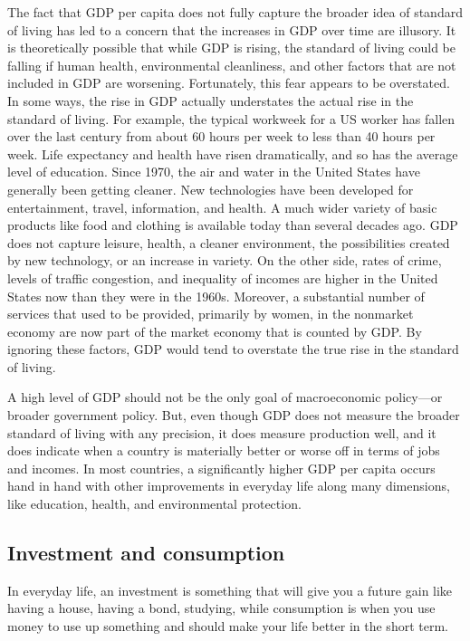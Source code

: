 The fact that GDP per capita does not fully capture the broader idea of standard of living has led to a concern that the increases in GDP over time are illusory. It is theoretically possible that while GDP is rising, the standard of living could be falling if human health, environmental cleanliness, and other factors that are not included in GDP are worsening. Fortunately, this fear appears to be overstated.
In some ways, the rise in GDP actually understates the actual rise in the standard of living. For example, the typical workweek for a US worker has fallen over the last century from about 60 hours per week to less than 40 hours per week. Life expectancy and health have risen dramatically, and so has the average level of education.
Since 1970, the air and water in the United States have generally been getting cleaner. New technologies have been developed for entertainment, travel, information, and health. A much wider variety of basic products like food and clothing is available today than several decades ago. GDP does not capture leisure, health, a cleaner environment, the possibilities created by new technology, or an increase in variety.
On the other side, rates of crime, levels of traffic congestion, and inequality of incomes are higher in the United States now than they were in the 1960s. Moreover, a substantial number of services that used to be provided, primarily by women, in the nonmarket economy are now part of the market economy that is counted by GDP. By ignoring these factors, GDP would tend to overstate the true rise in the standard of living.

A high level of GDP should not be the only goal of macroeconomic policy—or broader government policy. But, even though GDP does not measure the broader standard of living with any precision, it does measure production well, and it does indicate when a country is materially better or worse off in terms of jobs and incomes. In most countries, a significantly higher GDP per capita occurs hand in hand with other improvements in everyday life along many dimensions, like education, health, and environmental protection.

\subsection{Investment and consumption}
In everyday life, an investment is something that will give you a future gain like having a house, having a bond, studying, while consumption is when you use money to use up something and should make your life better in the short term.

